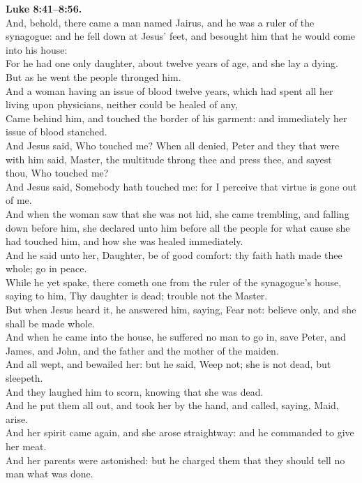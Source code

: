 \documentclass[10pt]{article} %
\begin{document}
{\begin{minipage}[t]{0.45\textwidth}
\textbf{Luke 8:41--8:56.}\\
And, behold, there came a man named Jairus, and he was a ruler of the synagogue: and he fell down at Jesus' feet, and besought him that he would come into his house:\\
For he had one only daughter, about twelve years of age, and she lay a dying. But as he went the people thronged him.\\
And a woman having an issue of blood twelve years, which had spent all her living upon physicians, neither could be healed of any,\\
Came behind him, and touched the border of his garment: and immediately her issue of blood stanched.\\
And Jesus said, Who touched me? When all denied, Peter and they that were with him said, Master, the multitude throng thee and press thee, and sayest thou, Who touched me?\\
And Jesus said, Somebody hath touched me: for I perceive that virtue is gone out of me.\\
And when the woman saw that she was not hid, she came trembling, and falling down before him, she declared unto him before all the people for what cause she had touched him, and how she was healed immediately.\\
And he said unto her, Daughter, be of good comfort: thy faith hath made thee whole; go in peace.\\
While he yet spake, there cometh one from the ruler of the synagogue's house, saying to him, Thy daughter is dead; trouble not the Master.\\
But when Jesus heard it, he answered him, saying, Fear not: believe only, and she shall be made whole.\\
And when he came into the house, he suffered no man to go in, save Peter, and James, and John, and the father and the mother of the maiden.\\
And all wept, and bewailed her: but he said, Weep not; she is not dead, but sleepeth.\\
And they laughed him to scorn, knowing that she was dead.\\
And he put them all out, and took her by the hand, and called, saying, Maid, arise.\\
And her spirit came again, and she arose straightway: and he commanded to give her meat.\\
And her parents were astonished: but he charged them that they should tell no man what was done.
\end{minipage}}
\end{document}

